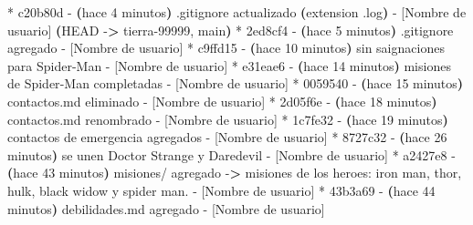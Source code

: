 \documentclass[
]{book}
\newenvironment{Shaded}{\begin{snugshade}}{\end{snugshade}}
\newcommand{\AttributeTok}[1]{\textcolor[rgb]{0.13,0.29,0.53}{#1}}
\newcommand{\ErrorTok}[1]{\textcolor[rgb]{0.64,0.00,0.00}{\textbf{#1}}}
\newcommand{\ExtensionTok}[1]{#1}
\newcommand{\KeywordTok}[1]{\textcolor[rgb]{0.13,0.29,0.53}{\textbf{#1}}}
\newcommand{\NormalTok}[1]{#1}
\newcommand{\OperatorTok}[1]{\textcolor[rgb]{0.81,0.36,0.00}{\textbf{#1}}}
\begin{document}
\begin{Shaded}
\begin{Highlighting}[]
\ExtensionTok{*}\NormalTok{ c20b80d }\AttributeTok{{-}} \ErrorTok{(}\ExtensionTok{hace}\NormalTok{ 4 minutos}\KeywordTok{)} \ExtensionTok{.gitignore}\NormalTok{ actualizado }\ErrorTok{(}\ExtensionTok{extension}\NormalTok{ .log}\KeywordTok{)} \ExtensionTok{{-}}\NormalTok{ [Nombre de usuario] }\ErrorTok{(}\ExtensionTok{HEAD} \AttributeTok{{-}}\OperatorTok{\textgreater{}}\NormalTok{ tierra{-}99999, main}\KeywordTok{)}
\ExtensionTok{*}\NormalTok{ 2ed8cf4 }\AttributeTok{{-}} \ErrorTok{(}\ExtensionTok{hace}\NormalTok{ 5 minutos}\KeywordTok{)} \ExtensionTok{.gitignore}\NormalTok{ agregado }\AttributeTok{{-}}\NormalTok{ [Nombre de usuario]}
\ExtensionTok{*}\NormalTok{ c9ffd15 }\AttributeTok{{-}} \ErrorTok{(}\ExtensionTok{hace}\NormalTok{ 10 minutos}\KeywordTok{)} \ExtensionTok{sin}\NormalTok{ saignaciones para Spider{-}Man }\AttributeTok{{-}}\NormalTok{ [Nombre de usuario]}
\ExtensionTok{*}\NormalTok{ e31eae6 }\AttributeTok{{-}} \ErrorTok{(}\ExtensionTok{hace}\NormalTok{ 14 minutos}\KeywordTok{)} \ExtensionTok{misiones}\NormalTok{ de Spider{-}Man completadas }\AttributeTok{{-}}\NormalTok{ [Nombre de usuario]}
\ExtensionTok{*}\NormalTok{ 0059540 }\AttributeTok{{-}} \ErrorTok{(}\ExtensionTok{hace}\NormalTok{ 15 minutos}\KeywordTok{)} \ExtensionTok{contactos.md}\NormalTok{ eliminado }\AttributeTok{{-}}\NormalTok{ [Nombre de usuario]}
\ExtensionTok{*}\NormalTok{ 2d05f6e }\AttributeTok{{-}} \ErrorTok{(}\ExtensionTok{hace}\NormalTok{ 18 minutos}\KeywordTok{)} \ExtensionTok{contactos.md}\NormalTok{ renombrado }\AttributeTok{{-}}\NormalTok{ [Nombre de usuario]}
\ExtensionTok{*}\NormalTok{ 1c7fe32 }\AttributeTok{{-}} \ErrorTok{(}\ExtensionTok{hace}\NormalTok{ 19 minutos}\KeywordTok{)} \ExtensionTok{contactos}\NormalTok{ de emergencia agregados }\AttributeTok{{-}}\NormalTok{ [Nombre de usuario]}
\ExtensionTok{*}\NormalTok{ 8727c32 }\AttributeTok{{-}} \ErrorTok{(}\ExtensionTok{hace}\NormalTok{ 26 minutos}\KeywordTok{)} \ExtensionTok{se}\NormalTok{ unen Doctor Strange y Daredevil }\AttributeTok{{-}}\NormalTok{ [Nombre de usuario]}
\ExtensionTok{*}\NormalTok{ a2427e8 }\AttributeTok{{-}} \ErrorTok{(}\ExtensionTok{hace}\NormalTok{ 43 minutos}\KeywordTok{)} \ExtensionTok{misiones/}\NormalTok{ agregado }\AttributeTok{{-}}\OperatorTok{\textgreater{}}\NormalTok{ misiones de los heroes: iron man, thor, hulk, black widow y spider man. }\AttributeTok{{-}}\NormalTok{ [Nombre de usuario]}
\ExtensionTok{*}\NormalTok{ 43b3a69 }\AttributeTok{{-}} \ErrorTok{(}\ExtensionTok{hace}\NormalTok{ 44 minutos}\KeywordTok{)} \ExtensionTok{debilidades.md}\NormalTok{ agregado }\AttributeTok{{-}}\NormalTok{ [Nombre de usuario]}

\end{Highlighting}
\end{Shaded}
\end{document}
